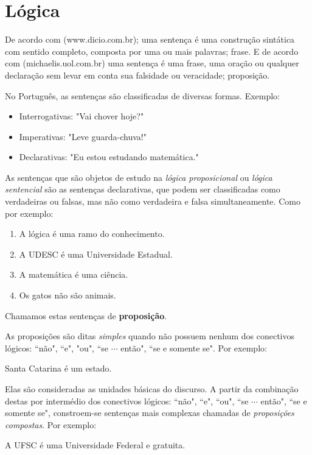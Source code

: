 \chapter{Lógica}

De acordo com (www.dicio.com.br); uma sentença é uma construção sintática com sentido completo, composta por uma ou mais palavras; frase. E de acordo com (michaelis.uol.com.br) uma sentença é uma frase, uma oração ou qualquer declaração sem levar em conta sua falsidade ou veracidade; proposição.

No Português, as sentenças são classificadas de diversas formas. Exemplo:
\begin{itemize}
 \item Interrogativas: "Vai chover hoje?"
 \item Imperativas: "Leve guarda-chuva!"
 \item Declarativas: "Eu estou estudando matemática."
\end{itemize}

As sentenças que são objetos de estudo na \emph{lógica proposicional} ou \emph{lógica sentencial} são as sentenças declarativas, que podem ser classificadas como verdadeiras ou falsas, mas não como verdadeira e falsa simultaneamente. Como por exemplo:

\begin{enumerate}
 \item A lógica é uma ramo do conhecimento.
 \item A UDESC é uma Universidade Estadual.
 \item A matemática é uma ciência.
 \item Os gatos não são animais.
\end{enumerate}


Chamamos estas sentenças de \textbf{proposição}.

As proposições são ditas \emph{simples} quando não possuem nenhum dos conectivos lógicos: ``não", ``e", "ou", ``se $\cdots$ então", ``se e somente se". Por exemplo:
\begin{center}
Santa Catarina é um estado.
\end{center}
Elas são consideradas as unidades básicas do discurso. A partir da combinação destas por intermédio dos conectivos lógicos: ``não", ``e", ``ou", ``se $\cdots$ então", ``se e somente se", constroem-se sentenças mais complexas chamadas de \emph{proposições compostas}. Por exemplo:
\begin{center}
A UFSC é uma Universidade Federal e gratuita.
\end{center}

